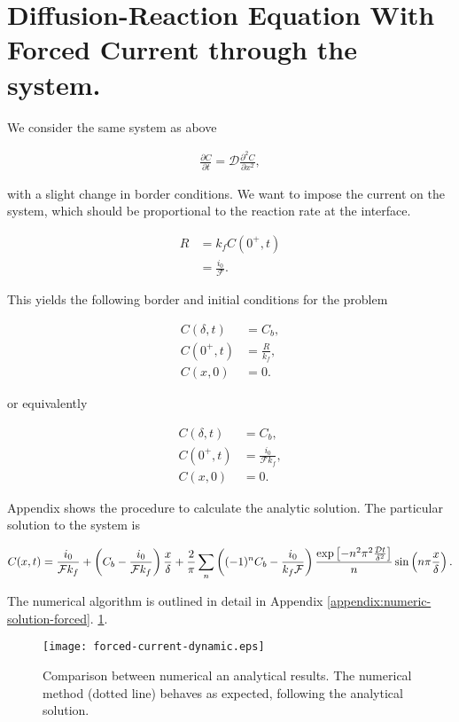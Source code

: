 \section{Diffusion-Reaction Equation With Forced Current through the system.}

We consider the same system as above

\begin{align}
	\frac{\partial C}{\partial t} = \mathcal{D}\frac{\partial^2 C}{\partial x^2},
\end{align}

with a slight change in border conditions. We want to impose the current on the system, which should be proportional to the reaction rate at the interface.

\begin{align}
	R &= k_f C(0^+, t)\\ 
	&= \frac{i_0}{\mathcal{F}}.
\end{align}

This yields the following border and initial conditions for the problem

\begin{align}
	C(\delta, t) &= C_b,\\
	C(0^+, t) &= \frac{R}{k_f},\\
	C(x, 0) &= 0.
\end{align}

or equivalently

\begin{align}
	C(\delta, t) &= C_b,\\
	C(0^+, t) &= \frac{i_0}{\mathcal{F}k_f},\\
	C(x, 0) &= 0.
\end{align}


Appendix \label{appendix:forced-current-analytic} shows the procedure to calculate the analytic solution. The particular solution to the system is




\begin{align}
	C(x, t) = \frac{i_0}{\mathcal{F}k_f} +\left({C_b - \frac{i_0}{\mathcal{F}k_f}}\right)\frac{x}{\delta} +\frac{2}{\pi}\sum_n \left({(-1)^n C_b- \frac{i_0}{k_f\mathcal{F}}}\right) \frac{\exp{\left[-n^2\pi^2\frac{\mathcal{D} t}{\delta^2}\right]}}{n}\sin\left(n\pi\frac{x}{\delta}\right).
\end{align}



\newpage


The numerical algorithm is outlined in detail in Appendix \ref{appendix:numeric-solution-forced}. \ref{fig:forced-current-dynamic}.

\begin{figure}[htbp]
\centering
\texttt{[image: forced-current-dynamic.eps]}
\caption{Comparison between numerical an analytical results. The numerical method  (dotted line) behaves as expected, following the analytical solution.}
\label{fig:forced-current-dynamic}
\end{figure}
